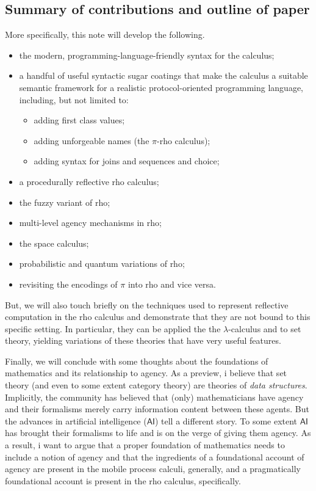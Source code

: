 \subsection{Summary of contributions and outline of paper}
More specifically, this note will develop the following.
\begin{itemize}
  \item the modern, programming-language-friendly syntax for the calculus;
  \item a handful of useful syntactic sugar coatings that make the
    calculus a suitable semantic framework for a realistic
    protocol-oriented programming language, including, but not limited
    to:
    \begin{itemize}
      \item adding first class values;
      \item adding unforgeable names (the $\pi$-rho calculus);
      \item adding syntax for joins and sequences and choice;
    \end{itemize}
  \item a procedurally reflective rho calculus;
  \item the fuzzy variant of rho;
  \item multi-level agency mechanisms in rho;
  \item the space calculus;
  \item probabilistic and quantum variations of rho;
  \item revisiting the encodings of $\pi$ into rho and vice versa.
\end{itemize}

But, we will also touch briefly on the techniques used to represent
reflective computation in the rho calculus and demonstrate that they
are not bound to this specific setting. In particular, they can be
applied the the $\lambda$-calculus and to set theory, yielding
variations of these theories that have very useful features.

Finally, we will conclude with some thoughts about the foundations of
mathematics and its relationship to agency. As a preview, i believe
that set theory (and even to some extent category theory) are theories
of \emph{data structures}. Implicitly, the community has believed that
(only) mathematicians have agency and their formalisms merely carry
information content between these agents. But the advances in
artificial intelligence ($\mathsf{AI}$) tell a different story. To
some extent $\mathsf{AI}$ has brought their formalisms to life and is
on the verge of giving them agency. As a result, i want to argue that
a proper foundation of mathematics needs to include a notion of agency
and that the ingredients of a foundational account of agency are
present in the mobile process calculi, generally, and a pragmatically
foundational account is present in the rho calculus, specifically.

